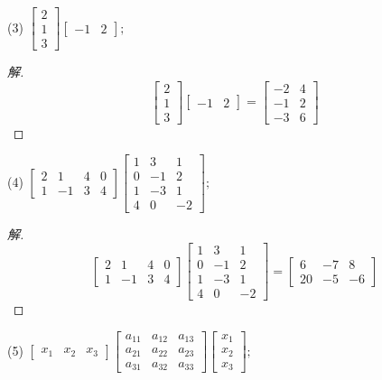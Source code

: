 \documentclass[10pt,a4paper]{report}
\begin{document}
\noindent (3)
$
\left[
\begin{matrix}
2 \\
1 \\
3 
\end{matrix}
\right] 
\left[
\begin{matrix}
-1 & 2
\end{matrix}
\right]; 
$

\begin{proof}[解]
	$$
	\left[
	\begin{matrix}
	2 \\
	1 \\
	3 
	\end{matrix}
	\right] 
	\left[
	\begin{matrix}
	-1 & 2
	\end{matrix}
	\right]=\left[
	\begin{matrix}
	-2 & 4 \\
	-1 & 2 \\
	-3 & 6 
	\end{matrix}
	\right] 
	$$
\end{proof}

\noindent (4)
$
\left[
\begin{matrix}
2 & 1 & 4 & 0 \\
1 & -1 & 3 & 4 
\end{matrix}
\right] 
\left[
\begin{matrix}
1 & 3 & 1 \\
0 & -1 & 2 \\
1 & -3 & 1 \\
4 & 0 & -2
\end{matrix}
\right]; 
$

\begin{proof}[解]
	$$
	\left[
	\begin{matrix}
	2 & 1 & 4 & 0 \\
	1 & -1 & 3 & 4 
	\end{matrix}
	\right] 
	\left[
	\begin{matrix}
	1 & 3 & 1 \\
	0 & -1 & 2 \\
	1 & -3 & 1 \\
	4 & 0 & -2
	\end{matrix}
	\right] = \left[
	\begin{matrix}
	6 & -7 & 8 \\
	20 & -5 & -6
	\end{matrix}
	\right]
	$$
\end{proof}

\noindent (5)
$
\left[
\begin{matrix}
x_{1} & x_{2} & x_{3} 
\end{matrix}
\right] 
\left[
\begin{matrix}
a_{11} & a_{12} & a_{13} \\
a_{21} & a_{22} & a_{23} \\
a_{31} & a_{32} & a_{33}
\end{matrix}
\right]
\left[
\begin{matrix}
x_{1} \\
x_{2} \\
x_{3}
\end{matrix}
\right];
$
\end{document}

